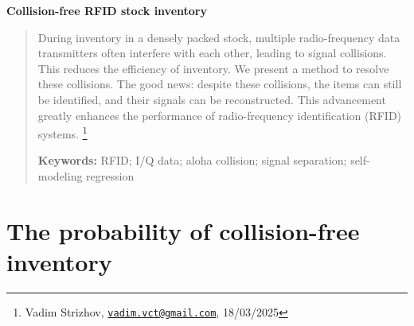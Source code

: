 \documentclass[12pt]{article}
\begin{document}
\begin{center}
{\Huge\bf Collision-free RFID stock inventory}%
\end{center}

\begin{quote}
During inventory in a densely packed stock, multiple radio-frequency data transmitters often interfere with each other, leading to signal collisions. This reduces the efficiency of inventory. We present a method to resolve these collisions. The good news: despite these collisions, the items can still be identified, and their signals can be reconstructed. This advancement greatly enhances the performance of radio-frequency identification (RFID) systems.
\footnote{Vadim Strizhov, \href{mailto:vadim.vct@gmail.com}{\texttt{vadim.vct@gmail.com}}, 18/03/2025}

\bigskip
\noindent \textbf{Keywords:} RFID; I/Q data;  aloha collision; signal separation; self-modeling regression
\bigskip
\end{quote}

\section{The probability of collision-free inventory}
\end{document}
